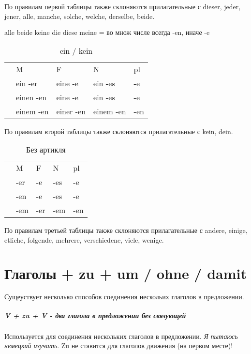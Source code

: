\documentclass[12pt,a4paper]{report}
\newcommand{\ubersatze}[1]{\textit{#1}}
\newcommand{\nom}{ {\color{black}{\textbf{N}}} }
\newcommand{\akk}{ {\color{red}{\textbf{A}}} }
\newcommand{\dat}{ {\color{blue}{\textbf{D}}} }
\begin{document}
По правилам первой таблицы также склоняются прилагательные с dieser, jeder, jener, alle, manche, solche, welche, derselbe, beide.

alle beide keine die diese meine = во множ числе всегда -en, иначе -e

\begin{longtable}{ c l l l l }
\caption{ein / kein} \label{tab:long} \\
		& M 			& F 		& N 		& pl 	\\
\nom 	& ein -er 		& eine -e	& ein -es	& -e	\\
\akk 	& einen -en 	& eine -e	& ein -es	& -e	\\
\dat 	& einem -en 	& einer -en	& einem -en	& -en	\\
\end{longtable}

По правилам второй таблицы также склоняются прилагательные с kein, dein.

\begin{longtable}{ c l l l l }
\caption{Без артикля} \label{tab:long} \\
		& M 	& F 	& N 	& pl 	\\
\nom 	& -er 	& -e	& -es	& -e	\\
\akk 	& -en 	& -e	& -es	& -e	\\
\dat 	& -em 	& -er	& -em	& -en	\\
\end{longtable}

По правилам третьей таблицы также склоняются прилагательные с andere, einige, etliche, folgende, mehrere, verschiedene, viele, wenige.


\newpage

\newpage

\newpage

\chapter{Глаголы + zu + um / ohne / damit}

Сущеуствует несколько способов соединения нескольих глаголов в предложении.

\paragraph{V + zu + V - два глагола в предложении без связующей}

Используется для соединения нескольких глаголов в предложении. \ubersatze{Я пытаюсь немецкий изучать}. Zu не ставится для глаголов движения (на первом месте)!
\end{document}
